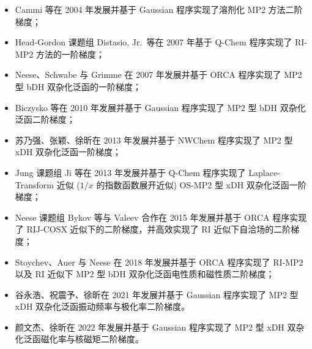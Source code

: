 \begin{itemize}[nosep]
  \item Cammi 等在 2004 年发展并基于 Gaussian 程序实现了溶剂化 MP2 方法二阶梯度\cite{Cammi-Frisch.TCA.2004}；
  \item Head-Gordon 课题组 Distasio, Jr.\ 等在 2007 年基于 Q-Chem 程序实现了 RI-MP2 方法的一阶梯度\cite{Distasio-Head-Gordon.JCC.2007}；
  \item Neese、Schwabe 与 Grimme 在 2007 年发展并基于 ORCA 程序实现了 MP2 型 bDH 双杂化泛函的一阶梯度\cite{Neese-Grimme.JCP.2007}；
  \item Biczysko 等在 2010 年发展并基于 Gaussian 程序实现了 MP2 型 bDH 双杂化泛函二阶梯度\cite{Biczysko-Barone.JCTC.2010}；
  \item 苏乃强、张颖、徐昕在 2013 年发展并基于 NWChem 程序实现了 MP2 型 xDH 双杂化泛函一阶梯度\cite{Su-Xu.JCC.2013}；
  \item Jung 课题组 Ji 等在 2013 年发展并基于 Q-Chem 程序实现了 Laplace-Transform 近似 ($1/x$ 的指数函数展开近似) OS-MP2 型 xDH 双杂化泛函一阶梯度\cite{Ji-Jung.JCTC.2013}；
  \item Neese 课题组 Bykov 等与 Valeev 合作在 2015 年发展并基于 ORCA 程序实现了 RIJ-COSX 近似下的二阶梯度，并高效实现了 RI 近似下自洽场的二阶梯度\cite{Bykov-Neese.MP.2015}；
  \item Stoychev、Auer 与 Neese 在 2018 年发展并基于 ORCA 程序实现了 RI-MP2 以及 RI 近似下 MP2 型 bDH 双杂化泛函电性质和磁性质二阶梯度\cite{Stoychev-Neese.JCTC.2018}；
  \item 谷永浩、祝震予、徐昕在 2021 年发展并基于 Gaussian 程序实现了 MP2 型 xDH 双杂化泛函振动频率与极化率二阶梯度\cite{Gu-Xu.JCTC.2021}。
  \item 颜文杰、徐昕在 2022 年发展并基于 Gaussian 程序实现了 MP2 型 xDH 双杂化泛函磁化率与核磁矩二阶梯度\cite{Yan-Xu.JCTC.2022}。
\end{itemize}



